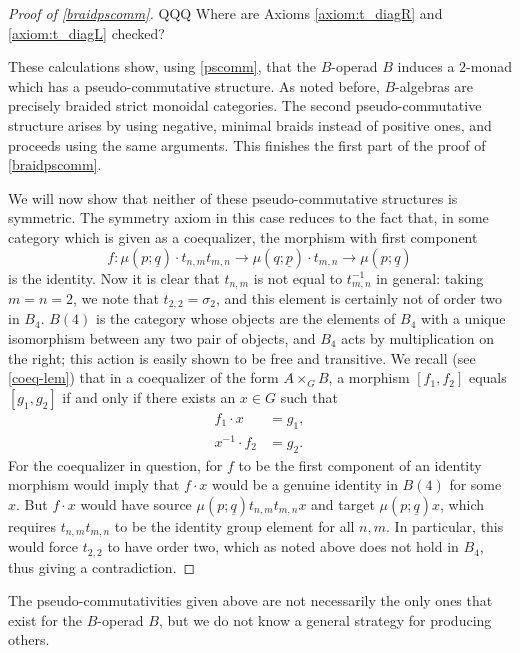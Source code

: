 \begin{proof}[Proof of \cref{braidpscomm}]
QQQ Where are Axioms \ref{axiom:t_diagR} and \ref{axiom:t_diagL} checked?

These calculations show, using \cref{pscomm}, that the $B$-operad $B$ induces a $2$-monad which has a pseudo-commutative structure. As noted before, $B$-algebras are precisely braided strict monoidal categories. The second pseudo-commutative structure arises by using negative, minimal braids instead of positive ones, and proceeds using the same arguments. This finishes the first part of the proof of \cref{braidpscomm}.

We will now show that neither of these pseudo-commutative structures is symmetric. The symmetry axiom in this case reduces to the fact that, in some category which is given as a coequalizer, the morphism with first component
  \[
    f\colon \mu\left(p; \underline{q}\right) \cdot t_{n,m}t_{m,n} \rightarrow \mu\left(q; \underline{p}\right) \cdot t_{m,n} \rightarrow \mu\left(p; \underline{q}\right)
  \]
is the identity. Now it is clear that $t_{n,m}$ is not equal to $t_{m,n}^{-1}$ in general: taking $m=n=2$, we note that $t_{2,2} = \sigma_{2}$, and this element is certainly not of order two in $B_{4}$. $B(4)$ is the category whose objects are the elements of $B_{4}$ with a unique isomorphism between any two pair of objects, and $B_{4}$ acts by multiplication on the right; this action is easily shown to be free and transitive. We recall (see \cref{coeq-lem}) that in a coequalizer of the form $A \times_{G} B$, a morphism $[f_{1}, f_{2}]$ equals $[g_{1}, g_{2}]$ if and only if there exists an $x \in G$ such that
  \begin{align*}
    f_{1} \cdot x &= g_{1}, \\
    x^{-1} \cdot f_{2} &= g_{2}.
  \end{align*}
For the coequalizer in question, for $f$ to be the first component of an identity morphism would imply that $f \cdot x$ would be a genuine identity in $B(4)$ for some $x$. But $f \cdot x$ would have source $\mu\left(p; \underline{q}\right) t_{n,m}t_{m,n}x$ and target $\mu\left(p; \underline{q}\right)x$, which requires $t_{n,m}t_{m,n}$ to be the identity group element for all $n,m$. In particular, this would force $t_{2,2}$ to have order two, which as noted above does not hold in $B_{4}$, thus giving a contradiction.
\end{proof}

\begin{rem}
The pseudo-commutativities given above are not necessarily the only ones that exist for the $B$-operad $B$, but we do not know a general strategy for producing others.
\end{rem}

